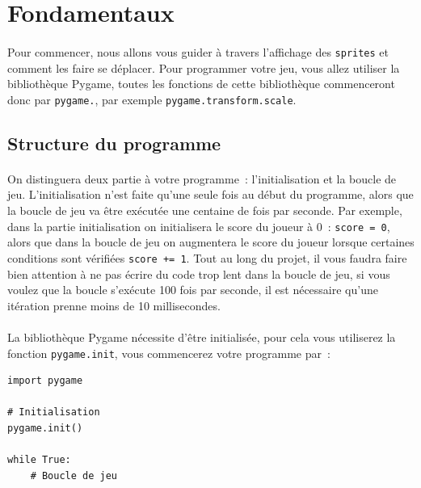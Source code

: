 \section{Fondamentaux}

\paragraph{}
Pour commencer, nous allons vous guider à travers l'affichage des \texttt{sprites} et comment les faire se déplacer.
Pour programmer votre jeu, vous allez utiliser la bibliothèque Pygame, toutes les fonctions de cette bibliothèque commenceront donc par \texttt{pygame.}, par exemple \texttt{pygame.transform.scale}.

\subsection{Structure du programme}
\label{sec:structure}

\paragraph{}
On distinguera deux partie à votre programme~: l'initialisation et la boucle de jeu.
L'initialisation n'est faite qu'une seule fois au début du programme, alors que la boucle de jeu va être exécutée une centaine de fois par seconde.
Par exemple, dans la partie initialisation on initialisera le score du joueur à 0~: \texttt{score = 0}, alors que dans la boucle de jeu on augmentera le score du joueur lorsque certaines conditions sont vérifiées \texttt{score += 1}.
Tout au long du projet, il vous faudra faire bien attention à ne pas écrire du code trop lent dans la boucle de jeu, si vous voulez que la boucle s'exécute 100 fois par seconde, il est nécessaire qu'une itération prenne moins de 10 millisecondes.

\paragraph{}
La bibliothèque Pygame nécessite d'être initialisée, pour cela vous utiliserez la fonction \texttt{pygame.init}, vous commencerez votre programme par~:
\begin{verbatim}
import pygame

# Initialisation
pygame.init()

while True:
    # Boucle de jeu
\end{verbatim}

